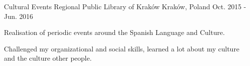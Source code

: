 \begin{cventries}
\cventry
    {Cultural Events} %
    {Regional Public Library of Kraków} %
    {Kraków, Poland} %
    {Oct. 2015 - Jun. 2016} %
    {
        \begin{cvitems} %
            \item {Realisation of periodic events around the Spanish Language and Culture.}
            \item {Challenged my organizational and social skills, learned a lot about my culture and the culture other people.}
        \end{cvitems}
    }

\end{cventries}
